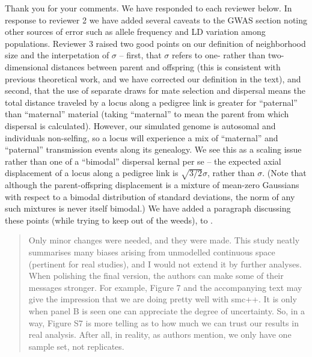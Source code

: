Thank you for your comments. We have responded to each reviewer below. In response to reviewer 2 we have added several caveats to the GWAS section noting other sources of error such as allele frequency and LD variation among populations. Reviewer 3 raised two good points on our definition of neighborhood size and the interpetation of $\sigma$ -- first, that $\sigma$ refers to one- rather than two-dimensional distances between parent and offspring (this is consistent with previous theoretical work, and we have corrected our definition in the text), and second, that the use of separate draws for mate selection and dispersal means the total distance traveled by a locus along a pedigree link is greater for ``paternal'' than ``maternal'' material (taking ``maternal'' to mean the parent from which dispersal is calculated). However, our simulated genome is autosomal and individuals non-selfing, so a locus will experience a mix of ``maternal'' and ``paternal'' transmission events along its genealogy. We see this as a scaling issue rather than one of a ``bimodal'' dispersal kernal per se -- the expected axial displacement of a locus along a pedigree link is $\sqrt{3/2} \sigma$, rather than $\sigma$.
(Note that although the parent-offspring displacement is a mixture of mean-zero Gaussians
with respect to a bimodal distribution of standard deviations,
the norm of any such mixtures is never itself bimodal.)
We have added a paragraph discussing these points (while trying to keep out of the weeds),
to .





\begin{quote}
Only minor changes were needed, and they were made. This study neatly summarises many biases arising from unmodelled continuous space (pertinent for real studies), and I would not extend it by further analyses. When polishing the final version, the authors can make some of their messages stronger. For example, Figure 7 and the accompanying text may give the impression that we are doing pretty well with smc++. It is only when panel B is seen one can appreciate the degree of uncertainty. So, in a way, Figure S7 is more telling as to how much we can trust our results in real analysis. After all, in reality, as authors mention, we only have one sample set, not replicates.
\end{quote}


